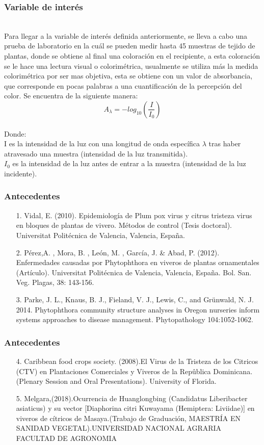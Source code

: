 \documentclass[11pt]{beamer}
\begin{document}
\begin{frame}
\frametitle{Variable de interés}
~\\Para llegar a la variable de interés definida anteriormente, se lleva a cabo una prueba de laboratorio en la cuál se pueden medir hasta 45 muestras de tejido de plantas, donde se obtiene al final una coloración en el recipiente, a esta coloración se le hace una lectura visual o colorimétrica, usualmente se utiliza más la medida colorimétrica por ser mas objetiva, esta se obtiene con un valor de absorbancia, que corresponde en pocas palabras a una cuantificación de la percepción del color. Se encuentra de la siguiente manera:
\[ A_\lambda=-log_{10} \left( \frac{I}{I_0}\right) \]
~\\Donde:
~\\I es la intensidad de la luz con una longitud de onda específica $\lambda$ tras haber atravesado una muestra (intensidad de la luz transmitida).
~\\$I_0$  es la intensidad de la luz antes de entrar a la muestra (intensidad de la luz incidente).
\end{frame}

\begin{frame}
\frametitle{Antecedentes}
\begin{itemize}
\item[1.]Vidal, E. (2010). Epidemiología de Plum pox virus y citrus tristeza virus en bloques de plantas de vivero. Métodos de control (Tesis doctoral). Universitat Politécnica de Valencia, Valencia, España.
\item[2.]Pérez,A. , Mora, B. , León, M. , García, J. \& Abad, P. (2012). Enfermedades causadas por Phytophthora en viveros de plantas ornamentales (Artículo). Universitat Politécnica de Valencia, Valencia, España. Bol. San. Veg. Plagas, 38: 143-156.
\item[3.]Parke, J. L., Knaus, B. J., Fieland, V. J., Lewis, C., and Grünwald, N. J.
2014. Phytophthora community structure analyses in Oregon nurseries
inform systems approaches to disease management. Phytopathology
104:1052-1062.
\end{itemize}
\end{frame}

\begin{frame}
\frametitle{Antecedentes}
\begin{itemize}
\item[4.]Caribbean food crops society. (2008).El Virus de la Tristeza de los Citricos (CTV) en Plantaciones Comerciales y Viveros
de la Repûblica Dominicana.(Plenary Session and Oral Presentations). University of Florida.
\item[5.]Melgara,(2018).Ocurrencia de Huanglongbing (Candidatus Liberibacter asiaticus) y su vector [Diaphorina citri Kuwayama (Hemiptera: Liviidae)] en viveros de cítricos de Masaya.(Trabajo de Graduación, MAESTRÍA EN SANIDAD VEGETAL).UNIVERSIDAD NACIONAL AGRARIA
FACULTAD DE AGRONOMIA
\end{itemize}
\end{frame}
\end{document}
